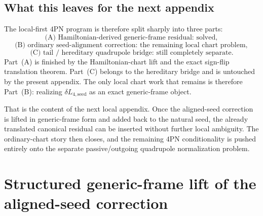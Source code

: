 \documentclass[11pt]{article}
\begin{document}
\subsection{What this leaves for the next appendix}
\label{app:ordinary-translation-next-step}

The local-first $4$PN program is therefore split sharply into three parts:
\begin{equation}
\boxed{\text{(A) Hamiltonian-derived generic-frame residual: solved},}
\label{eq:app-ordinary-translation-split-A}
\end{equation}
\begin{equation}
\boxed{\text{(B) ordinary seed-alignment correction: the remaining local chart problem},}
\label{eq:app-ordinary-translation-split-B}
\end{equation}
\begin{equation}
\boxed{\text{(C) tail / hereditary quadrupole bridge: still completely separate}.}
\label{eq:app-ordinary-translation-split-C}
\end{equation}
Part~(A) is finished by the Hamiltonian-chart lift and the exact sign-flip
translation theorem.  Part~(C) belongs to the hereditary bridge and is untouched
by the present appendix.  The only local chart work that remains is therefore
Part~(B): realizing
$\delta L_{4,\mathrm{seed}}$ as an exact generic-frame object.

That is the content of the next local appendix.  Once the aligned-seed
correction is lifted in generic-frame form and added back to the natural seed,
the already translated canonical residual can be inserted without further local
ambiguity.  The ordinary-chart story then closes, and the remaining $4$PN
conditionality is pushed entirely onto the separate passive/outgoing quadrupole
normalization problem.


\section{Structured generic-frame lift of the aligned-seed correction}
\label{app:structured-aligned-seed-lift}
\end{document}
